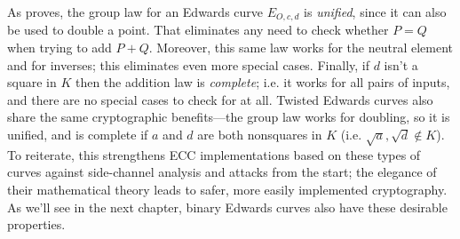 As \cite{bernstein2007faster} proves, the group law for an Edwards curve $E_{O,
    c, d}$ is \textit{unified}, since it can also be used to double a point.
That eliminates any need to check whether $P = Q$ when trying to add $P + Q$.
Moreover, this same law works for the neutral element and for inverses; this
    eliminates even more special cases.
Finally, if $d$ isn't a square in $K$ then the addition law is
    \textit{complete}; i.e. it works for all pairs of inputs, and there are no
    special cases to check for at all.
Twisted Edwards curves also share the same cryptographic benefits---the group
    law works for doubling, so it is unified, and is complete if $a$ and $d$
    are both nonsquares in $K$ (i.e. $\sqrt{a}, \sqrt{d} \not\in K$).
To reiterate, this strengthens ECC implementations based on these types of
    curves against side-channel analysis and attacks from the start; the
    elegance of their mathematical theory leads to safer, more easily
    implemented cryptography.
As we'll see in the next chapter, binary Edwards curves also have these
    desirable properties.
